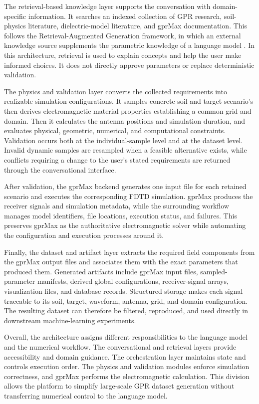 \documentclass[journal]{IEEEtran}
\begin{document}
The retrieval-based knowledge layer supports the conversation with domain-specific information. It searches an indexed collection of GPR research, soil-physics literature, dielectric-model literature, and gprMax documentation. This follows the Retrieval-Augmented Generation framework, in which an external knowledge source supplements the parametric knowledge of a language model \cite{lewis2020rag}. In this architecture, retrieval is used to explain concepts and help the user make informed choices. It does not directly approve parameters or replace deterministic validation.

The physics and validation layer converts the collected requirements into realizable simulation configurations. It samples concrete soil and target scenario's then derives electromagnetic material properties establishing a common grid and domain. Then it calculates the antenna positions and simulation duration, and evaluates physical, geometric, numerical, and computational constraints. Validation occurs both at the individual-sample level and at the dataset level. Invalid dynamic samples are resampled when a feasible alternative exists, while conflicts requiring a change to the user's stated requirements are returned through the conversational interface.

After validation, the gprMax backend generates one input file for each retained scenario and executes the corresponding FDTD simulation. gprMax produces the receiver signals and simulation metadata, while the surrounding workflow manages model identifiers, file locations, execution status, and failures. This preserves gprMax as the authoritative electromagnetic solver while automating the configuration and execution processes around it.

Finally, the dataset and artifact layer extracts the required field components from the gprMax output files and associates them with the exact parameters that produced them. Generated artifacts include gprMax input files, sampled-parameter manifests, derived global configurations, receiver-signal arrays, visualization files, and database records. Structured storage makes each signal traceable to its soil, target, waveform, antenna, grid, and domain configuration. The resulting dataset can therefore be filtered, reproduced, and used directly in downstream machine-learning experiments.


Overall, the architecture assigns different responsibilities to the language model and the numerical workflow. The conversational and retrieval layers provide accessibility and domain guidance. The orchestration layer maintains state and controls execution order. The physics and validation modules enforce simulation correctness, and gprMax performs the electromagnetic calculation. This division allows the platform to simplify large-scale GPR dataset generation without transferring numerical control to the language model.
\end{document}
